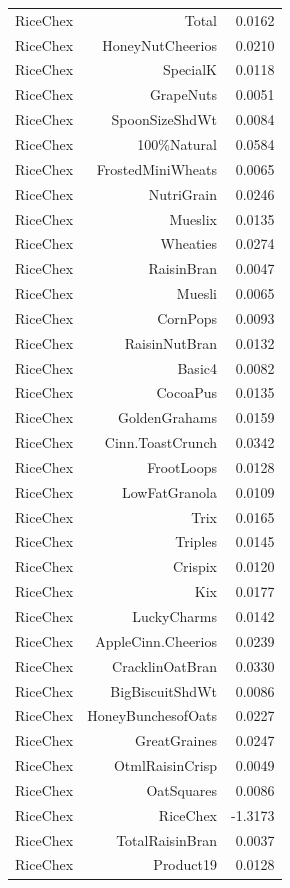 \begin{longtable}{@{}lrr@{}}
RiceChex & Total & 0.0162 \\
RiceChex & HoneyNutCheerios & 0.0210 \\
RiceChex & SpecialK & 0.0118 \\
RiceChex & GrapeNuts & 0.0051 \\
RiceChex & SpoonSizeShdWt & 0.0084 \\
RiceChex & 100\%Natural & 0.0584 \\
RiceChex & FrostedMiniWheats & 0.0065 \\
RiceChex & NutriGrain & 0.0246 \\
RiceChex & Mueslix & 0.0135 \\
RiceChex & Wheaties & 0.0274 \\
RiceChex & RaisinBran & 0.0047 \\
RiceChex & Muesli & 0.0065 \\
RiceChex & CornPops & 0.0093 \\
RiceChex & RaisinNutBran & 0.0132 \\
RiceChex & Basic4 & 0.0082 \\
RiceChex & CocoaPus & 0.0135 \\
RiceChex & GoldenGrahams & 0.0159 \\
RiceChex & Cinn.ToastCrunch & 0.0342 \\
RiceChex & FrootLoops & 0.0128 \\
RiceChex & LowFatGranola & 0.0109 \\
RiceChex & Trix & 0.0165 \\
RiceChex & Triples & 0.0145 \\
RiceChex & Crispix & 0.0120 \\
RiceChex & Kix & 0.0177 \\
RiceChex & LuckyCharms & 0.0142 \\
RiceChex & AppleCinn.Cheerios & 0.0239 \\
RiceChex & CracklinOatBran & 0.0330 \\
RiceChex & BigBiscuitShdWt & 0.0086 \\
RiceChex & HoneyBunchesofOats & 0.0227 \\
RiceChex & GreatGraines & 0.0247 \\
RiceChex & OtmlRaisinCrisp & 0.0049 \\
RiceChex & OatSquares & 0.0086 \\
RiceChex & RiceChex & -1.3173 \\
RiceChex & TotalRaisinBran & 0.0037 \\
RiceChex & Product19 & 0.0128 \\

\end{longtable}
